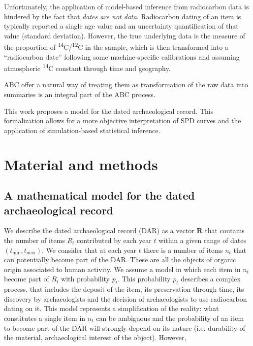 \documentclass[a4paper]{article}
\begin{document}
Unfortunately, the application of model-based inference from radiocarbon data is hindered by the fact that \textit{dates are not data}. Radiocarbon dating of an item is typically reported a single age value and an uncertainty quantification of that value (standard deviation). However, the true underlying data is the measure of the proportion of \textsuperscript{14}C/\textsuperscript{12}C in the sample, which is then transformed into a ``radiocarbon date'' following some machine-specific calibrations and assuming atmospheric \textsuperscript{14}C constant through time and geography. 




ABC offer a natural way of treating them as transformation of the raw data into summaries is an integral part of the ABC process.


This work proposes a model for the dated archaeological record. This formalization allows for a more objective interpretation of SPD curves and the application of simulation-based statistical inference.

 

\section*{\centering Material and methods}

\subsection*{A mathematical model for the dated archaeological record}

We describe the dated archaeological record (DAR) as a vector $\bm{R}$ that contains the number of items $R_t$ contributed by each year $t$ within a given range of dates $(t_{\mathrm{min}}, t_{\mathrm{max}})$. We consider that at each year $t$ there is a number of items $n_t$ that can potentially become part of the DAR. These are all the objects of organic origin associated to human activity. We assume a model in which each item in $n_t$ become part of $R_t$ with probability $p_t$. This probability $p_t$ describes a complex process, that includes the deposit of the item, its preservation through time, its discovery by archaeologists and the decision of archaeologists to use radiocarbon dating on it. This model represents a simplification of the reality: what constitutes a single item in $n_t$ can be ambiguous and the probability of an item to become part of the DAR will strongly depend on its nature (i.e. durability of the material, archaeological interest of the object). However, 
\end{document}
